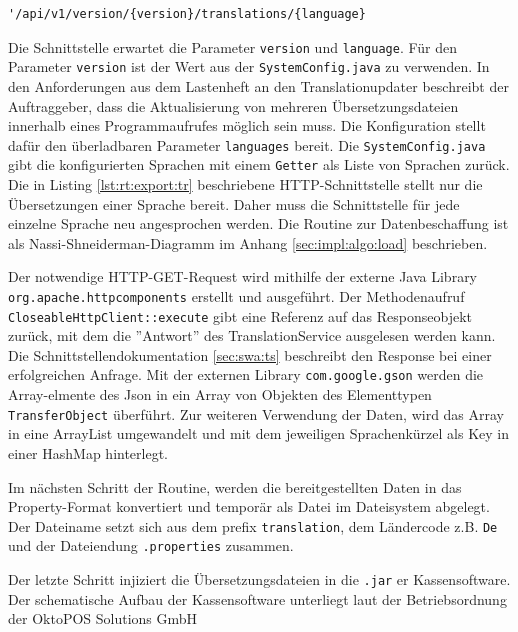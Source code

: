 \documentclass[10pt, oneside, ngerman]{article}
\begin{document}
    \begin{center}
      \begin{lstlisting}[caption={Export Translations}, captionpos=b, label=lst:rt:export:tr]
        '/api/v1/version/{version}/translations/{language}
      \end{lstlisting}
    \end{center}
    Die Schnittstelle erwartet die Parameter \lstinline{version} und \lstinline{language}. Für den Parameter \lstinline{version} ist der Wert aus der \lstinline{SystemConfig.java} zu verwenden.
    In den Anforderungen aus dem Lastenheft an den Translationupdater beschreibt der Auftraggeber, dass die Aktualisierung von mehreren Übersetzungsdateien innerhalb eines Programmaufrufes möglich sein muss.
    Die Konfiguration stellt dafür den überladbaren Parameter \lstinline{languages} bereit. Die \lstinline{SystemConfig.java} gibt die konfigurierten Sprachen mit einem \lstinline{Getter} als Liste von Sprachen zurück.
    Die in Listing \ref{lst:rt:export:tr} beschriebene HTTP-Schnittstelle stellt nur die Übersetzungen einer Sprache bereit. Daher muss die Schnittstelle für jede einzelne Sprache neu angesprochen werden. Die Routine zur Datenbeschaffung ist als
    Nassi-Shneiderman-Diagramm im Anhang \ref{sec:impl:algo:load} beschrieben.\par
    Der notwendige HTTP-GET-Request wird mithilfe der externe Java Library \lstinline{org.apache.httpcomponents} erstellt und ausgeführt. 
    Der Methodenaufruf \lstinline{CloseableHttpClient::execute} gibt eine Referenz auf das Responseobjekt zurück, mit dem die ''Antwort'' des TranslationService ausgelesen werden kann.
    Die Schnittstellendokumentation \ref{sec:swa:ts} beschreibt den Response bei einer erfolgreichen Anfrage. Mit der externen Library \lstinline{com.google.gson} werden die Array-elmente des
    Json in ein Array von Objekten des Elementtypen \lstinline{TransferObject} überführt. Zur weiteren Verwendung der Daten, wird das Array in eine ArrayList umgewandelt und mit dem jeweiligen Sprachenkürzel als Key in einer HashMap hinterlegt.\par
    Im nächsten Schritt der Routine, werden die bereitgestellten Daten in das Property-Format konvertiert und temporär als Datei im Dateisystem abgelegt. Der Dateiname setzt sich aus dem prefix \lstinline{translation}, dem Ländercode z.B. \lstinline{De} und
    der Dateiendung \lstinline{.properties} zusammen.\par
    Der letzte Schritt injiziert die Übersetzungsdateien in die \lstinline{.jar} er Kassensoftware. Der schematische Aufbau der Kassensoftware unterliegt laut der Betriebsordnung der OktoPOS Solutions GmbH
\end{document}
